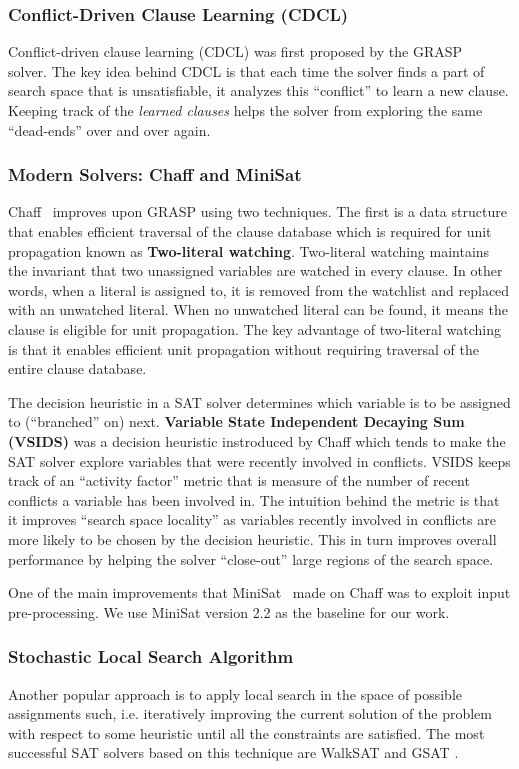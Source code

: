 \documentclass[letterpaper, compsoc, conference]{IEEEtran}
\begin{document}
\subsubsection{Conflict-Driven Clause Learning (CDCL)}

Conflict-driven clause learning (CDCL) was first proposed by the
GRASP~\cite{GRASP} solver. The key idea behind CDCL is that each time the
solver finds a part of search space that is unsatisfiable, it analyzes this
``conflict'' to learn a new clause. Keeping track of the \emph{learned clauses}
helps the solver from exploring the same ``dead-ends'' over and over again.

\subsubsection{Modern Solvers: Chaff and MiniSat} 
Chaff~\cite{CHAFF} improves upon GRASP using two techniques.  The first is a
data structure that enables efficient traversal of the clause database which is
required for unit propagation known as \textbf{Two-literal watching}.
Two-literal watching maintains the invariant that two unassigned variables are
watched in every clause. In other words, when a literal is assigned to, it is
removed from the watchlist and replaced with an unwatched literal. When no
unwatched literal can be found, it means the clause is eligible for unit
propagation. The key advantage of two-literal watching is that it enables
efficient unit propagation without requiring traversal of the entire clause
database.

The decision heuristic in a SAT solver determines which variable is to be
assigned to (``branched'' on) next.  \textbf{Variable State Independent
Decaying Sum (VSIDS)} was a decision heuristic instroduced by Chaff which tends
to make the SAT solver explore variables that were recently involved in
conflicts. VSIDS keeps track of an ``activity factor'' metric that is measure
of the number of recent conflicts a variable has been involved in.  The
intuition behind the metric is that it improves ``search space locality'' as
variables recently involved in conflicts are more likely to be chosen by the
decision heuristic.  This in turn improves overall performance by helping the
solver ``close-out'' large regions of the search space.

One of the main improvements that MiniSat~\cite{MiniSat} made on Chaff was
to exploit input pre-processing. We use MiniSat version 2.2 as the
baseline for our work.

\subsubsection{Stochastic Local Search Algorithm}
Another popular approach is to apply local search in the space of possible
assignments such, i.e. iteratively improving the current solution of the
problem with respect to some heuristic until all the constraints are satisfied.
The most successful SAT solvers based on this technique are WalkSAT
\cite{WalkSAT} and GSAT \cite{GSAT}.
\end{document}
